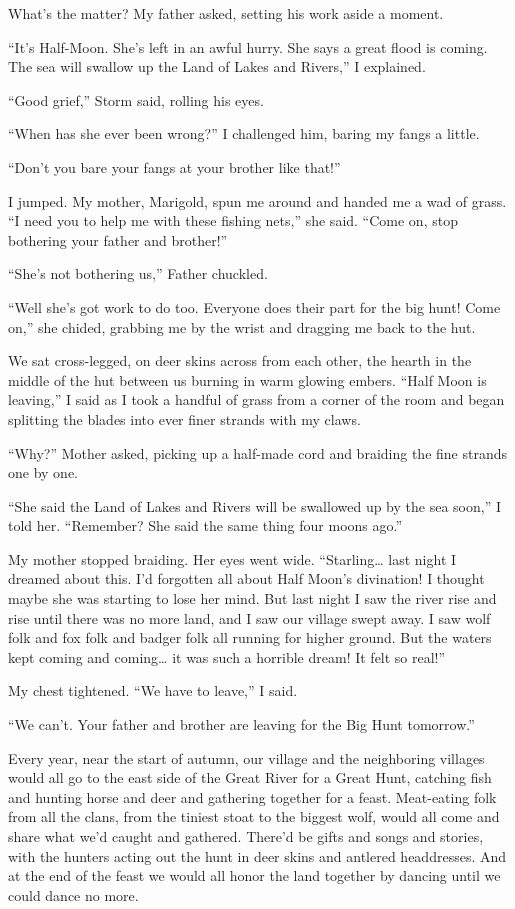 What's the matter? My father asked, setting his work aside a moment.

``It's Half-Moon. She's left in an awful hurry. She says a great flood is coming. The sea will swallow up the Land of Lakes and Rivers,'' I explained.

``Good grief,'' Storm said, rolling his eyes.

``When has she ever been wrong?'' I challenged him, baring my fangs a little.

``Don't you bare your fangs at your brother like that!''

I jumped. My mother, Marigold, spun me around and handed me a wad of grass. ``I need you to help me with these fishing nets,'' she said. ``Come on, stop bothering your father and brother!''

``She's not bothering us,'' Father chuckled.

``Well she's got work to do too. Everyone does their part for the big hunt! Come on,'' she chided, grabbing me by the wrist and dragging me back to the hut.

We sat cross-legged, on deer skins across from each other, the hearth in the middle of the hut between us burning in warm glowing embers. ``Half Moon is leaving,'' I said as I took a handful of grass from a corner of the room and began splitting the blades into ever finer strands with my claws.

``Why?'' Mother asked, picking up a half-made cord and braiding the fine strands one by one.

``She said the Land of Lakes and Rivers will be swallowed up by the sea soon,'' I told her. ``Remember? She said the same thing four moons ago.''

My mother stopped braiding. Her eyes went wide. ``Starling\ldots{} last night I dreamed about this. I'd forgotten all about Half Moon's divination! I thought maybe she was starting to lose her mind. But last night I saw the river rise and rise until there was no more land, and I saw our village swept away. I saw wolf folk and fox folk and badger folk all running for higher ground. But the waters kept coming and coming\ldots{} it was such a horrible dream! It felt so real!''

My chest tightened. ``We have to leave,'' I said.

``We can't. Your father and brother are leaving for the Big Hunt tomorrow.''

Every year, near the start of autumn, our village and the neighboring villages would all go to the east side of the Great River for a Great Hunt, catching fish and hunting horse and deer and gathering together for a feast. Meat-eating folk from all the clans, from the tiniest stoat to the biggest wolf, would all come and share what we'd caught and gathered. There'd be gifts and songs and stories, with the hunters acting out the hunt in deer skins and antlered headdresses. And at the end of the feast we would all honor the land together by dancing until we could dance no more.

